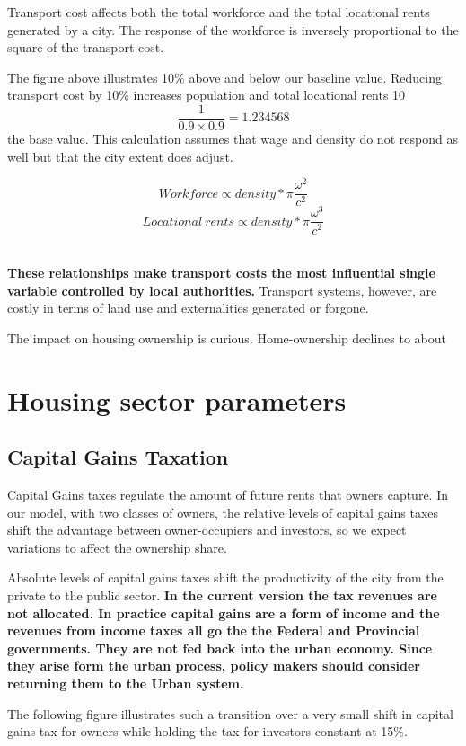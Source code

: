 \documentclass{article}
\begin{document}
Transport cost affects both the total workforce and the total locational rents generated by a city. The response of the workforce is inversely proportional to the square of the transport cost.  

The figure above illustrates 10\% above and below our baseline value.  Reducing transport cost by 10\% increases population and total locational rents 10 \[\frac{1}{0.9 \times 0.9}=1.234568\]
the base value. This calculation assumes that wage and density do not respond as well but that the city extent does adjust.

\[Workforce\propto density * \pi \frac{\omega^2}{c^2}\]
\[Locational\ rents\propto density * \pi \frac{\omega^3}{c^2}\]\

\textbf{These relationships make transport costs the most influential single variable controlled by local authorities.} Transport systems, however, are costly in terms of land use and externalities generated or forgone.

The impact on housing ownership is curious. Home-ownership declines to about 



\newpage %
\section{Housing sector parameters}

\subsection{Capital Gains Taxation}



Capital Gains taxes regulate the amount of future rents that owners capture.  In our model, with two classes of owners, the relative levels of capital gains taxes shift the advantage between owner-occupiers and investors, so we expect variations to affect the ownership share.


Absolute levels of capital gains taxes shift the productivity of the city from the private to the public sector. \textbf{In the current version the tax  revenues are not allocated.  In practice capital gains are a form of income and the revenues from income taxes all  go the the Federal and Provincial governments. They are not fed back into the urban economy. Since they arise form the urban process, policy makers should consider returning them to the Urban system.} 

 The following figure illustrates such a transition over a very small shift in capital gains tax for owners while holding the tax for investors constant at 15\%.
\end{document}
